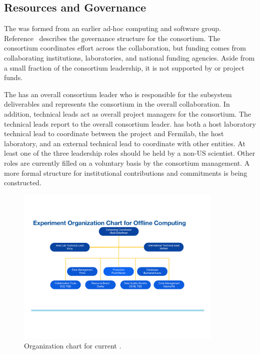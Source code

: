 \subsection{Resources and Governance}
\label{ch:exec-comp-gov}

The  was formed from an earlier ad-hoc  computing and software group. %
Reference~\cite{bib:docdb12751} describes the governance structure for the consortium.  The consortium coordinates effort across the collaboration, but funding comes from collaborating institutions, laboratories, and national funding agencies. Aside from a small fraction of the consortium leadership, it is not supported by  or  project funds.  

The %
 has an overall consortium leader %
who is responsible for the subsystem deliverables and represents the consortium in the overall  collaboration.
In addition, technical leads act as overall project managers for the consortium. The technical leads report to the overall consortium leader.
 has both a host laboratory technical lead to coordinate between the  project and Fermilab, the host laboratory, and an external technical lead to coordinate with other entities.
At least one of the three leadership roles should be held by a non-US scientist. 
Other roles are currently filled on a voluntary basis by the consortium management.  A more formal structure for institutional contributions and commitments is being constructed. 


\begin{figure}[htp]
\centering
\includegraphics[height=3in]{graphics/comp_Org_Chart.pdf}
\caption[Organization chart for current ]{Organization chart for current . }
\label{fig:ch-exec-comp-org}
\end{figure}

